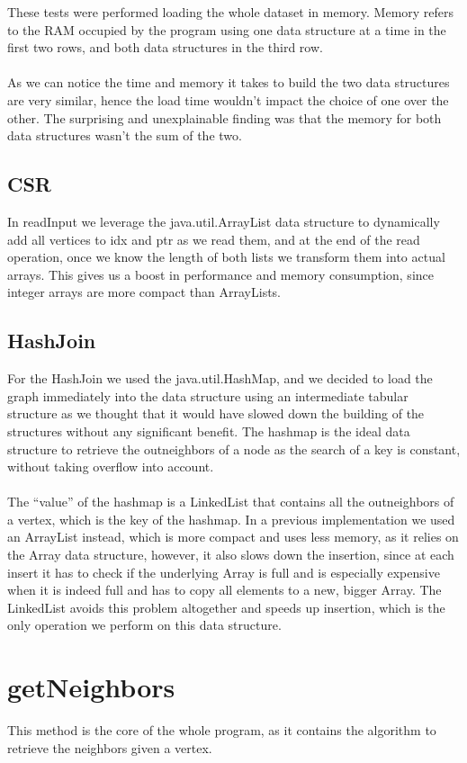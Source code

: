 \documentclass[twocolumn]{article}
\begin{document}
These tests were performed loading the whole dataset in memory. Memory refers to the RAM occupied by the program using one data structure at a time in the first two rows, and both data structures in the third row.
\\\\
As we can notice the time and memory it takes to build the two data structures are very similar, hence the load time wouldn't impact the choice of one over the other. 
The surprising and unexplainable finding was that the memory for both data structures wasn't the sum of the two. 

\subsection{CSR}
In readInput we leverage the java.util.ArrayList data structure to dynamically add all vertices to idx and ptr as we read them, and at the end of the read operation, once we know the length of both lists we transform them into actual arrays. This gives us a boost in performance and memory consumption, since integer arrays are more compact than ArrayLists.

\subsection{HashJoin}
For the HashJoin we used the java.util.HashMap, and we decided to load the graph immediately into the data structure using an intermediate tabular structure as we thought that it would have slowed down the building of the structures without any significant benefit. 
The hashmap is the ideal data structure to retrieve the outneighbors of a node as the search of a key is constant, without taking overflow into account.
\\\\
The “value” of the hashmap is a LinkedList that contains all the outneighbors of a vertex, which is the key of the hashmap. In a previous implementation we used an ArrayList instead, which is more compact and uses less memory, as it relies on the Array data structure, however, it also slows down the insertion, since at each insert it has to check if the underlying Array is full and is especially expensive when it is indeed full and has to copy all elements to a new, bigger Array. The LinkedList avoids this problem altogether and speeds up insertion, which is the only operation we perform on this data structure.

\section{getNeighbors}
This method is the core of the whole program, as it contains the algorithm to retrieve the neighbors given a vertex. 
\end{document}
